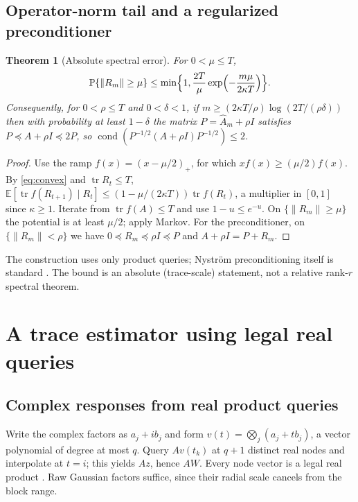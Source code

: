 \documentclass[11pt,a4paper]{article}
\newtheorem{theorem}{Theorem}[section]
\theoremstyle{definition}\newtheorem{definition}[theorem]{Definition}
\theoremstyle{remark}\newtheorem{remark}[theorem]{Remark}
\numberwithin{equation}{section}
\newcommand{\E}{\mathbb E}
\newcommand{\Prob}{\mathbb P}
\newcommand{\tr}{\operatorname{tr}}
\newcommand{\norm}[1]{\lVert#1\rVert}
\begin{document}
\subsection{Operator-norm tail and a regularized preconditioner}
\begin{theorem}[Absolute spectral error]\label{thm:op}
For $0<\mu\le T$,
\begin{equation}\label{eq:spectral}
 \Prob\{\norm{R_m}\ge\mu\}\le\min\Bigl\{1,\frac{2T}\mu\exp\Bigl(-\frac{m\mu}{2\kappa T}\Bigr)\Bigr\}.
\end{equation}
Consequently, for $0<\rho\le T$ and $0<\delta<1$, if
$m\ge(2\kappa T/\rho)\log(2T/(\rho\delta))$ then with probability at least
$1-\delta$ the matrix $P=\widehat A_m+\rho I$ satisfies
$P\preceq A+\rho I\preceq2P$, so
$\operatorname{cond}(P^{-1/2}(A+\rho I)P^{-1/2})\le2$.
\end{theorem}
\begin{proof}
Use the ramp $f(x)=(x-\mu/2)_+$, for which $xf(x)\ge(\mu/2)f(x)$. By
\eqref{eq:convex} and $\tr R_t\le T$, $\E[\tr f(R_{t+1})\mid R_t]\le(1-\mu/(2\kappa T))\tr f(R_t)$,
a multiplier in $[0,1]$ since $\kappa\ge1$. Iterate from $\tr f(A)\le T$ and use
$1-u\le e^{-u}$. On $\{\norm{R_m}\ge\mu\}$ the potential is at least $\mu/2$; apply
Markov. For the preconditioner, on $\{\norm{R_m}<\rho\}$ we have
$0\preceq R_m\preceq\rho I\preceq P$ and $A+\rho I=P+R_m$.
\end{proof}
The construction uses only product queries; Nystr\"om preconditioning itself is
standard \cite{FTU}. The bound is an absolute (trace-scale) statement, not a
relative rank-$r$ spectral theorem.

\section{A trace estimator using legal real queries}\label{sec:estimator}
\subsection{Complex responses from real product queries}
Write the complex factors as $a_j+ib_j$ and form
$v(t)=\bigotimes_j(a_j+tb_j)$, a vector polynomial of degree at most $q$.
Query $Av(t_k)$ at $q+1$ distinct real nodes and interpolate at $t=i$; this
yields $Az$, hence $AW$. Every node vector is a legal real product
\cite[Lemma~4.2]{Holden}. Raw Gaussian factors suffice, since their radial
scale cancels from the block range.
\end{document}
